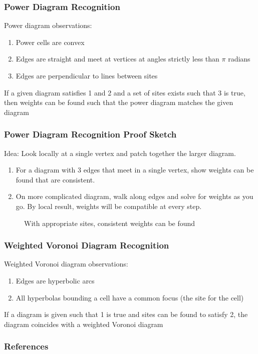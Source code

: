 \documentclass{beamer}
\begin{document}
\begin{frame}
  \frametitle{Power Diagram Recognition}

  Power diagram observations:
  \begin{enumerate}
    \item Power cells are convex
    \item Edges are straight and meet at vertices at angles strictly less than $\pi$ radians
    \item Edges are perpendicular to lines between sites
  \end{enumerate}

  If a given diagram satisfies 1 and 2 and a set of sites exists such that 3 is true, then weights can be found such that the power diagram matches
  the given diagram \cite{ash-bolker}

\end{frame}

\begin{frame}
  \frametitle{Power Diagram Recognition Proof Sketch}

  Idea: Look locally at a single vertex and patch together the larger diagram.

  \begin{enumerate}
    \item For a diagram with 3 edges that meet in a single vertex, show weights can be found that are consistent.
    \item On more complicated diagram, walk along edges and solve for weights as you go. By local result, weights will be compatible at every step.
  \end{enumerate}

  \begin{figure}
    \caption{With appropriate sites, consistent weights can be found}
  \end{figure}

\end{frame}

\begin{frame}
  \frametitle{Weighted Voronoi Diagram Recognition}

  Weighted Voronoi diagram observations:
  \begin{enumerate}
    \item Edges are hyperbolic arcs
    \item All hyperbolas bounding a cell have a common focus (the site for the cell)
  \end{enumerate}

  If a diagram is given such that 1 is true and sites can be found to satisfy 2, the diagram coincides with a weighted Voronoi diagram
  \cite{ash-bolker}

\end{frame}

\begin{frame}[allowframebreaks]
  \frametitle{References}

  {\footnotesize
  \printbibliography}

\end{frame}
\end{document}
